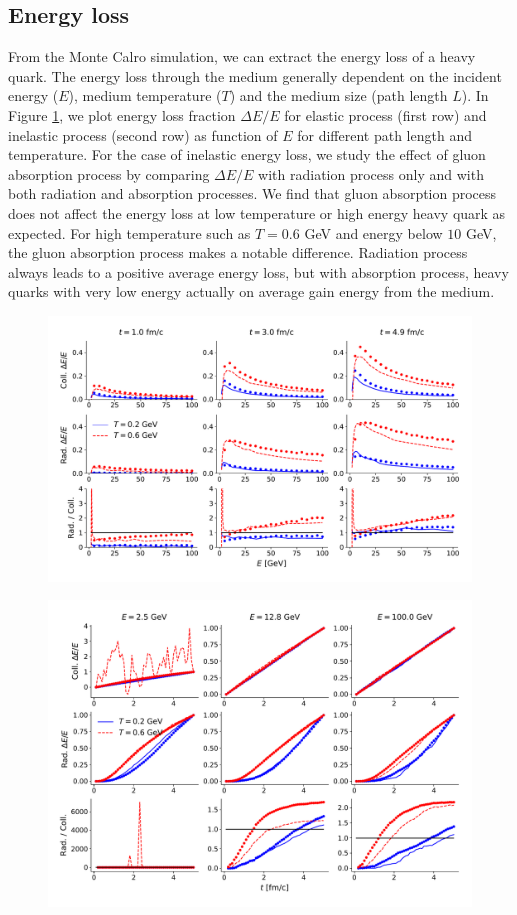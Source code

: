\documentclass[aps, prc, reprint, amsmath, groupedaddress, nofootinbib]{revtex4-1}
\begin{document}
\subsection{Energy loss}
From the Monte Calro simulation, we can extract the energy loss of a heavy quark.
The energy loss through the medium generally dependent on the incident energy ($E$), medium temperature ($T$) and the medium size (path length $L$).
In Figure \ref{plots:dE-E}, we plot energy loss fraction $\Delta E/E$ for elastic process (first row) and inelastic process (second row) as function of $E$ for different path length and temperature.
For the case of inelastic energy loss, we study the effect of gluon absorption process by comparing $\Delta E/E$ with radiation process only and with both radiation and absorption processes.
We find that gluon absorption process does not affect the energy loss at low temperature or high energy heavy quark as expected.
For high temperature such as $T=0.6$ GeV and energy below $10$ GeV, the gluon absorption process makes a notable difference.
Radiation process always leads to a positive average energy loss, but with absorption process, heavy quarks with very low energy actually on average gain energy from the medium.
\begin{figure}
\includegraphics[width=.8\textwidth]{E_Eloss.pdf}
\caption{}\label{plots:dE-E}
\end{figure}

\begin{figure}
\includegraphics[width=.8\textwidth]{L_Eloss.pdf}
\end{figure}
\end{document}
